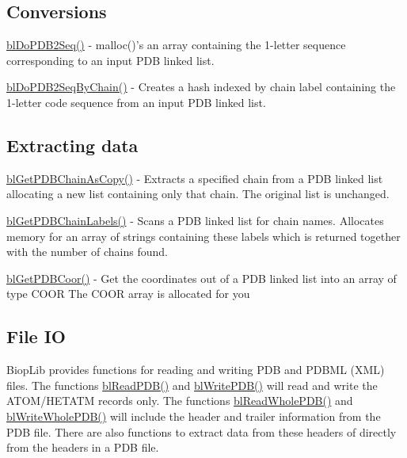 \subsection*{Conversions }


\begin{DoxyItemize}
\item \hyperlink{_p_d_b2_seq_8c_a3ceea54ec3e1794795d12708eb15d21b}{bl\-Do\-P\-D\-B2\-Seq()} -\/ malloc()'s an array containing the 1-\/letter sequence corresponding to an input P\-D\-B linked list.
\item \hyperlink{_p_d_b2_seq_8c_a1e99d4509d7280688a936f96d9c00325}{bl\-Do\-P\-D\-B2\-Seq\-By\-Chain()} -\/ Creates a hash indexed by chain label containing the 1-\/letter code sequence from an input P\-D\-B linked list.
\end{DoxyItemize}

\subsection*{Extracting data }


\begin{DoxyItemize}
\item \hyperlink{_get_p_d_b_chain_as_copy_8c_a28ae20b6b67825c2ae27c06f9a2181f9}{bl\-Get\-P\-D\-B\-Chain\-As\-Copy()} -\/ Extracts a specified chain from a P\-D\-B linked list allocating a new list containing only that chain. The original list is unchanged.
\item \hyperlink{_get_p_d_b_chain_labels_8c_a194b4eb40e29c5ee194b7e2cd2485fda}{bl\-Get\-P\-D\-B\-Chain\-Labels()} -\/ Scans a P\-D\-B linked list for chain names. Allocates memory for an array of strings containing these labels which is returned together with the number of chains found.
\item \hyperlink{_get_p_d_b_coor_8c_a5ffc3606c858d7c4151905728cf7e30d}{bl\-Get\-P\-D\-B\-Coor()} -\/ Get the coordinates out of a P\-D\-B linked list into an array of type C\-O\-O\-R The C\-O\-O\-R array is allocated for you
\end{DoxyItemize}

\subsection*{File I\-O }

Biop\-Lib provides functions for reading and writing P\-D\-B and P\-D\-B\-M\-L (X\-M\-L) files. The functions \hyperlink{pdb_8h_a4027e61f67886772894d7a948a3be2c0}{bl\-Read\-P\-D\-B()} and \hyperlink{pdb_8h_a55086bc1125dc7baa000bf42ddcf5930}{bl\-Write\-P\-D\-B()} will read and write the A\-T\-O\-M/\-H\-E\-T\-A\-T\-M records only. The functions \hyperlink{pdb_8h_aac630c13aff6802b905c10ce97d64761}{bl\-Read\-Whole\-P\-D\-B()} and \hyperlink{pdb_8h_a41023286849e00cae2fbe0a6c89118f2}{bl\-Write\-Whole\-P\-D\-B()} will include the header and trailer information from the P\-D\-B file. There are also functions to extract data from these headers of directly from the headers in a P\-D\-B file.

